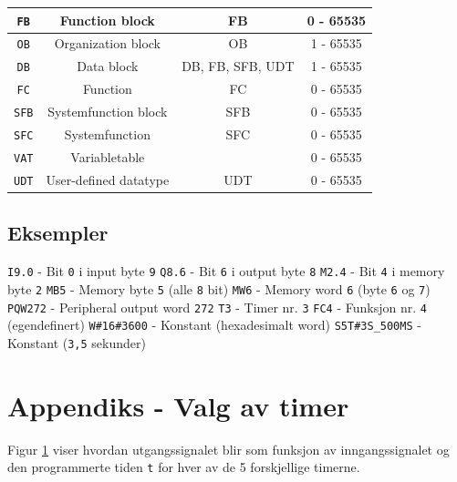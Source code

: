 \begin{center}
{\begin{tabular}{|c| c| c| c|}
 \texttt{FB} & Function block & FB & 0 - 65535\\
 \hline
  \texttt{OB} & Organization block & OB & 1 - 65535\\
 \hline
  \texttt{DB} & Data block & DB, FB, SFB, UDT & 1 - 65535 \\
 \hline
  \texttt{FC} & Function & FC & 0 - 65535 \\
  \hline
  \texttt{SFB} & Systemfunction block & SFB & 0 - 65535 \\
 \hline
  \texttt{SFC} & Systemfunction & SFC & 0 - 65535 \\
 \toprule
 
 \texttt{VAT} & Variabletable &  & 0 - 65535 \\
 \hline
 \texttt{UDT} & User-defined datatype & UDT & 0 - 65535 \\
 \toprule
\end{tabular}}
\end{center}

\subsection*{Eksempler}
\verb|I9.0| - Bit \verb|0| i input byte \verb|9|\newline
\verb|Q8.6| - Bit \verb|6| i output byte \verb|8|\newline
\verb|M2.4| - Bit \verb|4| i memory byte \verb|2|\newline
\verb|MB5| - Memory byte \verb|5| (alle \verb|8| bit)\newline
\verb|MW6| - Memory word \verb|6| (byte \verb|6| og \verb|7|)\newline
\verb|PQW272| - Peripheral output word \verb|272|\newline
\verb|T3| - Timer nr. \verb|3|\newline
\verb|FC4| - Funksjon nr. \verb|4| (egendefinert)\newline
\verb|W#16#3600| - Konstant (hexadesimalt word)\newline
\verb|S5T#3S_500MS| - Konstant (\verb|3,5| sekunder)


\clearpage
\section{Appendiks - Valg av timer}\label{app:timer}

Figur \ref{app:timer} viser hvordan utgangssignalet blir som funksjon av inngangssignalet
og den programmerte tiden \texttt{t} for hver av de 5 forskjellige timerne.

